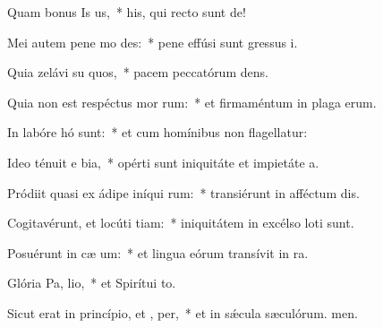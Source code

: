 \item Quam bonus Is us,~* his, qui recto sunt de!
\item Mei autem pene mo  des:~* pene effúsi sunt gressus i.
\item Quia zelávi su quos,~* pacem peccatórum dens.
\item Quia non est respéctus mor rum:~* et firmaméntum in plaga erum.
\item In labóre hó  sunt:~* et cum homínibus non flagellatur:
\item Ideo ténuit e bia,~* opérti sunt iniquitáte et impietáte a.
\item Pródiit quasi ex ádipe iníqui rum:~* transiérunt in afféctum dis.
\item Cogitavérunt, et locúti  tiam:~* iniquitátem in excélso loti sunt.
\item Posuérunt in cæ  um:~* et lingua eórum transívit in ra.
\item Glória Pa,  lio,~* et Spirítui to.
\item Sicut erat in princípio, et ,  per,~* et in sǽcula sæculórum. men.
